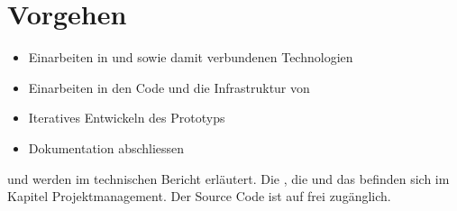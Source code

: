 \section{Vorgehen}
\begin{itemize}
	\item Einarbeiten in  und  sowie damit verbundenen Technologien
	\item Einarbeiten in den Code und die Infrastruktur von \kort{}
	\item Iteratives Entwickeln des Prototyps
	\item Dokumentation abschliessen
\end{itemize}

 und  werden im technischen Bericht erläutert.
Die , die  und das  befinden sich im Kapitel Projektmanagement. 
Der Source Code ist auf  frei zugänglich.
